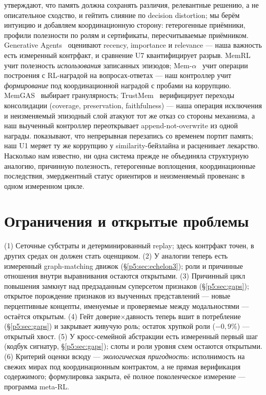 \documentclass{article}
\begin{document}
\citet{rdd2026} утверждают, что память должна сохранять различия,
релевантные решению, а не описательное сходство, и гейтить слияние по
decision distortion; мы берём интуицию и добавляем координационную
сторону: гетерогенные приёмники, профили полезности по ролям и
сертификаты, пересчитываемые приёмником. Generative
Agents~\citep{genagents2023} оценивают recency, importance и
relevance --- наша важность есть измеренный контрфакт, и сравнение U7
квантифицирует разрыв. MemRL~\citep{memrl2026} учит полезность
\emph{использования} записанных эпизодов;
Mem-$\alpha$~\citep{memalpha2025} учит операции построения с
RL-наградой на вопросах-ответах --- наш контроллер учит
\emph{формирование} под координационной наградой с пробами на
коррупцию. MemGAS~\citep{memgas2025} выбирает гранулярность;
TrustMem~\citep{trustmem2026} верифицирует переходы консолидации
(coverage, preservation, faithfulness) --- наша операция исключения и
неизменяемый эпизодный слой атакуют тот же отказ со стороны
механизма, а наш выученный контроллер переоткрывает
append-not-overwrite из одной награды. \citet{faulty2026} показывают,
что непрерывная перезапись со временем портит память; наш U1 меряет
ту же коррупцию у similarity-бейзлайна и расценивает лекарство.
Насколько нам известно, ни одна система прежде не объединяла
структурную аналогию, причинную полезность, гетерогенные воплощения,
координационные последствия, эмерджентный статус ориентиров и
неизменяемый провенанс в одном измеренном цикле.

\section{Ограничения и открытые проблемы}
\label{p5:sec:limits}

(1) Сеточные субстраты и детерминированный replay; здесь контрфакт
точен, в других средах он должен стать оценщиком. (2) У аналогии теперь есть измеренный graph-matching движок
(\S\ref{p5:sec:echelon3}); роли и причинные отношения внутри
выравнивания остаются открытыми. (3) Причинный цикл
повышения замкнут над предзаданным суперсетом признаков
(\S\ref{p5:sec:gaps}); открытое порождение признаков из выученных
представлений --- новые перцептивные концепты, именуемые и проверяемые
между модальностями --- остаётся открытым. (4) Гейт доверие$\times$давность теперь вшит в потребление
(\S\ref{p5:sec:gaps}) и закрывает живучую роль; остаток хрупкой роли
($-0{,}9\%$) --- открытый хвост. (5) У кросс-семейной абстракции есть
измеренный первый шаг (кодбук сигнатур, \S\ref{p5:sec:gaps}); слоты и
роли уровня схем остаются открытыми. (6) Критерий оценки всюду --- \emph{экологическая
пригодность}: исполнимость на свежих мирах под координационным
контрактом, а не прямая верификация содержимого; формулировка
закрыта, её полное поколенческое измерение --- программа meta-RL.
\end{document}
